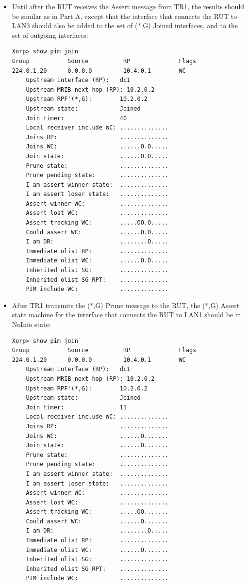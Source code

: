 \documentclass[11pt]{report}
\begin{document}
\begin{itemize}

  \item Until after the RUT receives the Assert message from TR1, the results
  should be similar as in Part A, except that the interface that connects the
  RUT to LAN3 should also be added to the set of (*,G) Joined interfaces, and
  to the set of outgoing interfaces:

\begin{verbatim}
Xorp> show pim join 
Group           Source          RP              Flags
224.0.1.20      0.0.0.0         10.4.0.1        WC   
    Upstream interface (RP):   dc1
    Upstream MRIB next hop (RP): 10.2.0.2
    Upstream RPF'(*,G):        10.2.0.2
    Upstream state:            Joined 
    Join timer:                40
    Local receiver include WC: ..............
    Joins RP:                  ..............
    Joins WC:                  ......O.O.....
    Join state:                ......O.O.....
    Prune state:               ..............
    Prune pending state:       ..............
    I am assert winner state:  ..............
    I am assert loser state:   ..............
    Assert winner WC:          ..............
    Assert lost WC:            ..............
    Assert tracking WC:        .....OO.O.....
    Could assert WC:           ......O.O.....
    I am DR:                   ........O.....
    Immediate olist RP:        ..............
    Immediate olist WC:        ......O.O.....
    Inherited olist SG:        ..............
    Inherited olist SG_RPT:    ..............
    PIM include WC:            ..............
\end{verbatim}

  \item After TR1 transmits the (*,G) Prune message to the RUT, the (*,G)
  Assert state machine for the interface that connects the RUT to LAN1 should
  be in NoInfo state:

\begin{verbatim}
Xorp> show pim join 
Group           Source          RP              Flags
224.0.1.20      0.0.0.0         10.4.0.1        WC   
    Upstream interface (RP):   dc1
    Upstream MRIB next hop (RP): 10.2.0.2
    Upstream RPF'(*,G):        10.2.0.2
    Upstream state:            Joined 
    Join timer:                11
    Local receiver include WC: ..............
    Joins RP:                  ..............
    Joins WC:                  ......O.......
    Join state:                ......O.......
    Prune state:               ..............
    Prune pending state:       ..............
    I am assert winner state:  ..............
    I am assert loser state:   ..............
    Assert winner WC:          ..............
    Assert lost WC:            ..............
    Assert tracking WC:        .....OO.......
    Could assert WC:           ......O.......
    I am DR:                   ........O.....
    Immediate olist RP:        ..............
    Immediate olist WC:        ......O.......
    Inherited olist SG:        ..............
    Inherited olist SG_RPT:    ..............
    PIM include WC:            ..............
\end{verbatim}


\end{itemize}
\end{document}
